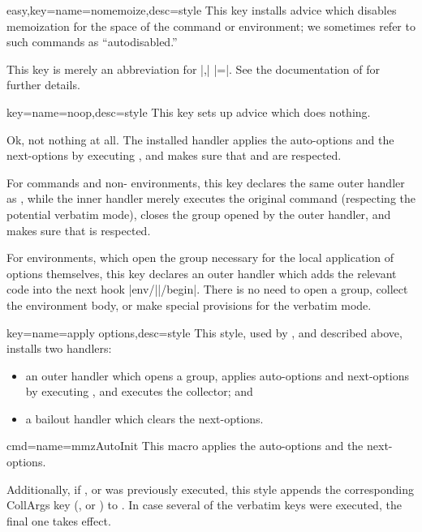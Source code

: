 \documentclass[a4paper,11pt]{article}
\begin{document}
\begin{doc}{easy,key={name=nomemoize,desc=style}}
  This key installs advice which disables memoization for the space of the
  command or environment; we sometimes refer to such commands as
  ``autodisabled.''

  This key is merely an abbreviation for |,|
  |=|.  See the documentation of
   for further details.
\end{doc}

\begin{doc}{key={name=noop,desc=style}}
  This key sets up advice which does nothing.

  Ok, not nothing at all.  The installed handler applies the auto-options and
  the next-options by executing , and makes sure that
   and  are respected.

  For commands and non- environments, this key declares the same
  outer handler as , while the inner handler merely
  executes the original command (respecting the potential verbatim mode),
  closes the group opened by the outer handler, and makes sure that
   is respected.

  For  environments, which open the group necessary for the local
  application of options themselves, this key declares an outer handler which
  adds the relevant code into the next hook |env/||/begin|.  There is no need to open a group, collect the environment
  body, or make special provisions for the verbatim mode.
\end{doc}


\begin{doc}{key={name=apply options,desc=style}}
  This style, used by ,  and
   described above, installs two handlers:
  \begin{itemize}
  \item an outer handler which opens a group, applies auto-options and
    next-options by executing , and executes the collector;
    and
  \item a bailout handler which clears the next-options.
  \end{itemize}
\end{doc}


\begin{doc}{cmd={name=mmzAutoInit}}
  This macro applies the auto-options and the next-options.

  Additionally, if ,  or  was
  previously executed, this style appends the corresponding CollArgs key
  (,  or ) to .  In case several of the
  verbatim keys were executed, the final one takes effect.
\end{doc}
\end{document}
